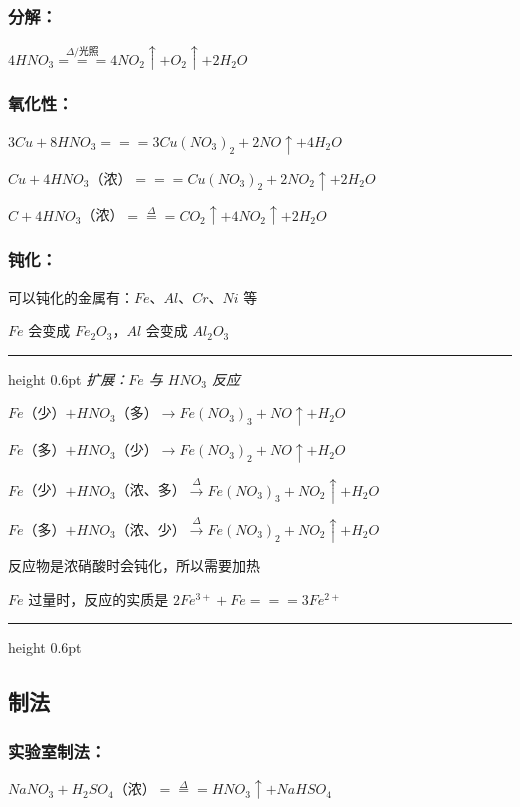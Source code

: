 \documentclass[UTF8,zihao=-4,openany]{ctexbook}
\newenvironment{notebox}
  {\par\smallskip\noindent\begingroup\begin{minipage}{\linewidth}\color{noteframe}\hrule height 0.6pt\smallskip\color{black}\itshape}
  {\par\smallskip\color{noteframe}\hrule height 0.6pt\end{minipage}\endgroup\par\smallskip}
\begin{document}
\subsubsection{分解：}
$4HNO_3\stackrel{\Delta /\mbox{光照}}{=\!=\!=}4NO_2\uparrow+O_2\uparrow+2H_2O$\par
\subsubsection{氧化性：}
$3Cu+8HNO_3=\!=\!=3Cu(NO_3)_2+2NO\uparrow+4H_2O$\par

$Cu+4HNO_3$（浓）$=\!=\!=Cu(NO_3)_2+2NO_2\uparrow+2H_2O$\par

$C+4HNO_3$（浓）$\stackrel{\Delta}{=\!=\!=}CO_2\uparrow+4NO_2\uparrow+2H_2O$\par
\subsubsection{钝化：}
可以钝化的金属有：$Fe$、$Al$、$Cr$、$Ni$ 等\par

$Fe$ 会变成 $Fe_2O_3$，$Al$ 会变成 $Al_2O_3$\par

\begin{notebox}
扩展：$Fe$ 与 $HNO_3$ 反应\par
$Fe$（少）$+HNO_3$（多）$\rightarrow Fe(NO_3)_3+NO\uparrow+H_2O$\par
$Fe$（多）$+HNO_3$（少）$\rightarrow Fe(NO_3)_2+NO\uparrow+H_2O$\par
$Fe$（少）$+HNO_3$（浓、多）$\stackrel{\Delta}{\rightarrow} Fe(NO_3)_3+NO_2\uparrow+H_2O$\par
$Fe$（多）$+HNO_3$（浓、少）$\stackrel{\Delta}{\rightarrow} Fe(NO_3)_2+NO_2\uparrow+H_2O$\par
反应物是浓硝酸时会钝化，所以需要加热\par
$Fe$ 过量时，反应的实质是 $2Fe^{3+}+Fe=\!=\!=3Fe^{2+}$\par
\end{notebox}
\subsection{制法}
\subsubsection{实验室制法：}
$NaNO_3+H_2SO_4$（浓）$\stackrel{\Delta}{=\!=\!=}HNO_3\uparrow+NaHSO_4$\par
\end{document}
